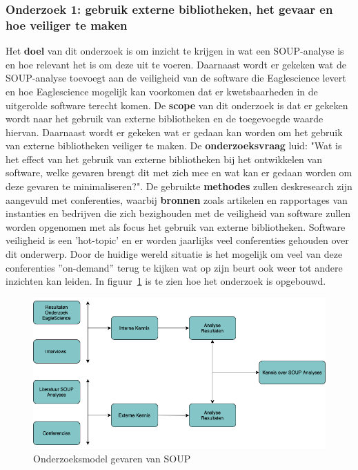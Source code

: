 \subsubsection{Onderzoek 1: gebruik externe bibliotheken, het gevaar en hoe veiliger te maken}
Het \textbf{doel} van dit onderzoek is om inzicht te krijgen in wat een SOUP-analyse is en hoe relevant het is om deze uit te voeren. Daarnaast wordt er gekeken wat de SOUP-analyse toevoegt aan de veiligheid van de software die Eaglescience levert en hoe Eaglescience mogelijk kan voorkomen dat er kwetsbaarheden in de uitgerolde software terecht komen.
De \textbf{scope} van dit onderzoek is dat er gekeken wordt naar het gebruik van externe bibliotheken en de toegevoegde waarde hiervan. Daarnaast wordt er gekeken wat er gedaan kan worden om het gebruik van externe bibliotheken veiliger te maken.
De \textbf{onderzoeksvraag} luid: "Wat is het effect van het gebruik van externe bibliotheken bij het ontwikkelen van software, welke gevaren brengt dit met zich mee en wat kan er gedaan worden om deze gevaren te minimaliseren?".
De gebruikte \textbf{methodes} zullen deskresearch zijn aangevuld met conferenties, waarbij \textbf{bronnen} zoals artikelen en rapportages van instanties en bedrijven die zich bezighouden met de veiligheid van software zullen worden opgenomen met als focus het gebruik van externe bibliotheken. Software veiligheid is een 'hot-topic' en er worden jaarlijks veel conferenties gehouden over dit onderwerp. Door de huidige wereld situatie is het mogelijk om veel van deze conferenties  ''on-demand'' terug te kijken wat op zijn beurt ook weer tot andere inzichten kan leiden. In figuur~\ref{fig:OnderzoeksModelNoodZaakSOUP} is te zien hoe het onderzoek is opgebouwd.
\begin{figure}[htbp]
    \myfloatalign
    \includegraphics[width=12cm]{gfx/OnderzoeksmodelSOUP}
    \caption{Onderzoeksmodel gevaren van SOUP}
    \label{fig:OnderzoeksModelNoodZaakSOUP}
\end{figure}



